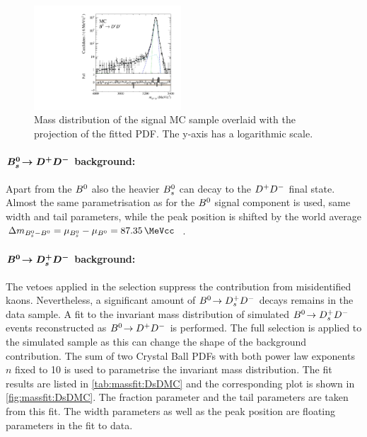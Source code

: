 \begin{figure}[tbh]
\centering
\includegraphics[width=0.49\textwidth]{07-B02DD/figs/obsMass_MC.pdf}
\caption{Mass distribution of the \BdToDD signal MC sample overlaid with the
projection of the fitted PDF. The y-axis has a logarithmic scale.}%
\label{fig:b02dd:massfit:mc}
\end{figure}

\paragraph{$\boldsymbol{{{B}^0_{s}}\!\rightarrow {\ensuremath{{D}^+}}{\ensuremath{{D}^-}}}$ background:}
Apart from the ${{B}^0}$ also the heavier ${{B}^0_{s}}$ can decay to the ${{D}^+}{{D}^-}$ final state.
Almost the same parametrisation as for the ${{B}^0}$ signal component is used, \ie
same width and tail parameters, while the peak position is shifted by the
world average $\dmBdBs = \mu_{\Bs} - \mu_{\Bd} =
\SI{87.35}{\MeVcc}$~\cite{PDG2014}.

\paragraph{$\boldsymbol{{{B}^0}\!\rightarrow {\ensuremath{{D}^+_{s}}}{\ensuremath{{D}^-}}}$ background:}
The vetoes applied in the selection suppress the contribution from
misidentified kaons. Nevertheless, a significant amount of \mbox{${{B}^0}\!\rightarrow {\ensuremath{{D}^+_{s}}}{\ensuremath{{D}^-}}$}
decays remains in the data sample. A fit to the invariant mass distribution of
simulated ${{B}^0}\!\rightarrow {\ensuremath{{D}^+_{s}}}{\ensuremath{{D}^-}}$ events reconstructed as ${{B}^0}\!\rightarrow {\ensuremath{{D}^+}}{\ensuremath{{D}^-}}$ is performed. The full
selection is applied to the simulated sample as this can change the shape of
the \BdToDsD background contribution. The sum of two Crystal Ball PDFs with
both power law exponents $n$ fixed to \num{10} is used to parametrise the
invariant mass distribution. The fit results are listed in
\cref{tab:massfit:DsDMC} and the corresponding plot is shown in
\cref{fig:massfit:DsDMC}. The fraction parameter and the tail parameters are
taken from this fit. The width parameters as well as the peak position are
floating parameters in the fit to data.

